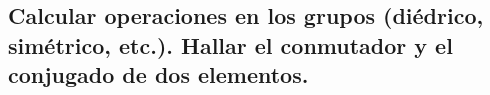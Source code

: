 \subsection{Calcular operaciones en los grupos (diédrico, simétrico, etc.). Hallar el conmutador y el conjugado de dos elementos.}

